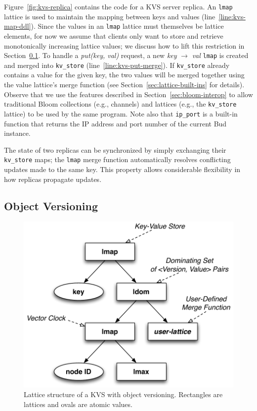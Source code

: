 Figure~\ref{fig:kvs-replica} contains the \lang code for a KVS server
replica. An \texttt{lmap} lattice is used to maintain the mapping between keys
and values (line~\ref{line:kvs-map-ddl}). Since the values in an \texttt{lmap}
lattice must themselves be lattice elements, for now we assume that clients only
want to store and retrieve monotonically increasing lattice values; we discuss
how to lift this restriction in Section~\ref{sec:kvs-versions}. To handle a
\emph{put(key, val)} request, a new \emph{key} $\to$ \emph{val} \texttt{lmap} is
created and merged into \texttt{kv\_store} (line~\ref{line:kvs-put-merge}). If
\texttt{kv\_store} already contains a value for the given key, the two values
will be merged together using the value lattice's merge function (see
Section~\ref{sec:lattice-built-ins} for details). Observe that we use the \lang
features described in Section~\ref{sec:bloom-interop} to allow traditional Bloom
collections (e.g., channels) and lattices (e.g., the \texttt{kv\_store} lattice)
to be used by the same program. Note also that \texttt{ip\_port} is a built-in
function that returns the IP address and port number of the current Bud
instance.

The state of two replicas can be synchronized by simply exchanging their
\texttt{kv\_store} maps; the \texttt{lmap} merge function automatically resolves
conflicting updates made to the same key. This property allows considerable
flexibility in how replicas propagate updates.

\subsection{Object Versioning}
\label{sec:kvs-versions}
\begin{figure}[t]
\centering
\includegraphics[width=0.8\linewidth]{fig/kvs-vc-lattice.pdf}
\caption{Lattice structure of a KVS with object versioning. Rectangles are
  lattices and ovals are atomic values.}
\label{fig:kvs-vc-lattices}
\end{figure}


